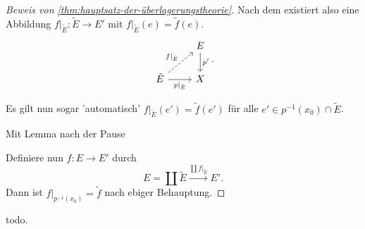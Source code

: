 \begin{proof}[Beweis von \autoref{thm:hauptsatz-der-überlagerungstheorie}]
    Nach dem  existiert also eine Abbildung $f|_{\tilde{E}}\colon \tilde{E} \to  E'$ mit $f|_{\tilde{E}}(e) = \tilde{f}(e)$.
    \[
    \begin{tikzcd}
        & E \ar{d}{p'} \\
        \tilde{E} \ar[dashed]{ur}{f|_{\tilde{E}}} \ar[swap]{r}{p|_{\tilde{E}}} & X
    \end{tikzcd}
    .\]
    \begin{claim}
        Es gilt nun sogar 'automatisch' $f|_{\tilde{E}}(e') = \tilde{f}(e')$ für alle $e' \in p^{-1} (x_0) \cap  \tilde{E}$.
    \end{claim}
    \begin{subproof}
        Mit Lemma nach der Pause
    \end{subproof}
    Definiere nun $f\colon  E \to  E'$ durch
    \[
    E = \coprod \tilde{E} \stackrel{\coprod f|_{\tilde{E}}}{\longrightarrow} E'
    .\] 
    Dann ist $f|_{p^{-1} (x_0)} = \tilde{f}$ nach ebiger Behauptung.
\end{proof}


\begin{lemma}
    todo.
\end{lemma}
